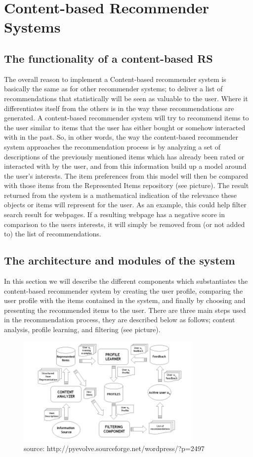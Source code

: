 \section{Content-based Recommender Systems}
\label{sec:content}

\subsection{The functionality of a content-based RS}
The overall reason to implement a Content-based recommender system is basically the same as for other recommender systems; to deliver a list of recommendations that statistically will be seen as valuable to the user. Where it differentiates itself from the others is in the way these recommendations are generated. A content-based recommender system will try to recommend items to the user similar to items that the user has either bought or somehow interacted with in the past. So, in other words, the way the content-based recommender system approaches the recommendation process is by analyzing a set of descriptions of the previously mentioned items which has already been rated or interacted with by the user, and from this information build up a model around the user’s interests. The item preferences from this model will then be compared with those items from the Represented Items repository (see picture). The result returned from the system is a mathematical indication of the relevance these objects or items will represent for the user. As an example, this could help filter search result for webpages. If a resulting webpage has a negative score in comparison to the users interests, it will simply be removed from (or not added to) the list of recommendations.

\subsection{The architecture and modules of the system}
In this section we will describe the different components which substantiates the content-based recommender system by creating the user profile, comparing the user profile with the items contained in the system, and finally by choosing and presenting the recommended items to the user. 
There are three main steps used in the recommendation process, they are described below as follows; content analysis, profile learning, and filtering (see picture).

\begin{figure}[ht!]
\centering
\includegraphics[width=90mm]{Pictures/contentdescription.png}
\caption{source: http://pyevolve.sourceforge.net/wordpress/?p=2497}
\label{contentdescription}
\end{figure}

